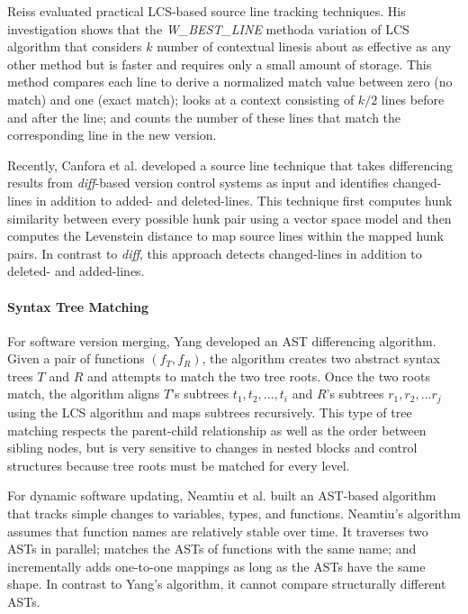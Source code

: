 \documentclass[runningheads,a4paper]{llncs}
\begin{document}
Reiss \cite{Reiss2008} evaluated practical LCS-based source line tracking techniques. His investigation shows that the {\it W\_BEST\_LINE} method\textemdash  a variation of LCS algorithm that considers $k$ number of contextual lines\textemdash is about as effective as any other method but is faster and requires only a small amount of storage. This method compares each line to derive a normalized match value between zero (no match) and one (exact match); looks at a context consisting of $k/2$ lines before and after the line; and counts the number of these lines that match the corresponding line in the new version.  

Recently, Canfora et al. \cite{Canfora2007} developed a source line technique that takes differencing results from {\it diff}-based version control systems as input and identifies changed-lines in addition to added- and deleted-lines. This technique first computes hunk similarity between every possible hunk pair using a vector space model and then computes the Levenstein distance \cite{Levenstein1966} to map source lines within the mapped hunk pairs. In contrast to {\it diff}, this approach detects changed-lines in addition to deleted- and added-lines. 



\paragraph{Syntax Tree Matching}
For software version merging, Yang \cite{Yang1991} developed an AST differencing algorithm. Given a pair of functions $(f_T,f_R)$, the algorithm creates two abstract syntax trees $T$ and $R$ and attempts to match the two tree roots. Once the two roots match, the algorithm aligns $T$'s subtrees ${t_1, t_2, ..., t_i}$ and $R$'s subtrees ${r_1, r_2, ... r_j}$ using the LCS algorithm and maps subtrees recursively. This type of tree matching respects the parent-child relationship as well as the order between sibling nodes, but is very sensitive to changes in nested blocks and control structures because tree roots must be matched for every level. 

For dynamic software updating, Neamtiu et al. \cite{Neamtiu2005} built an AST-based algorithm that tracks simple changes to variables, types, and functions. Neamtiu's algorithm assumes that function names are relatively stable over time. 
It
traverses two ASTs in parallel;
matches the ASTs of functions with the same name; 
and incrementally adds one-to-one mappings as long as the ASTs have the same shape. In contrast to Yang's algorithm, it cannot compare structurally different ASTs. 
\end{document}
